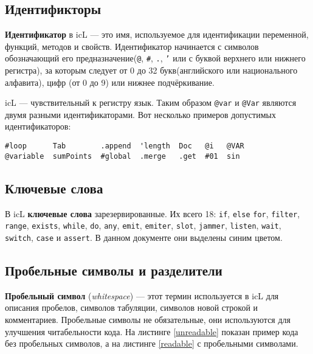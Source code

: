\subsection{Идентификторы}

\textbf{Идентификатор} в icL — это имя, используемое для идентификации переменной, функций, методов и свойств. Идентификатор начинается с символов обозначающий его предназначение(\texttt{@}, \texttt{#}, \texttt{.}, \texttt{'} или с буквой верхнего или нижнего регистра), за которым следует от 0 до 32 букв(английского или национального алфавита), цифр (от 0 до 9) или нижнее подчёркивание.

icL — чувствительный к регистру язык. Таким образом \texttt{@var} и \texttt{@Var} являются двумя разными идентификаторами. Вот несколько примеров допустимых идентификаторов:

\begin{verbatim}
#loop      Tab        .append  'length  Doc   @i   @VAR
@variable  sumPoints  #global  .merge   .get  #01  sin
\end{verbatim}

\subsection{Ключевые слова}

В icL \textbf{ключевые слова} зарезервированные. Их всего 18: \texttt{if}, \texttt{else} \texttt{for}, \texttt{filter}, \texttt{range}, \texttt{exists}, \texttt{while}, \texttt{do}, \texttt{any}, \texttt{emit}, \texttt{emiter}, \texttt{slot}, \texttt{jammer}, \texttt{listen}, \texttt{wait}, \texttt{switch}, \texttt{case} и \texttt{assert}. В данном документе они выделены синим цветом.

\subsection{Пробельные символы и разделители}

\textbf{Пробельный символ} (\textit{whitespace}) — этот термин используется в icL для описания пробелов, символов табуляции, символов новой строкой и комментариев. Пробельные символы не обязательные, они используются для улучшения читабельности кода. На листинге \ref{unreadable} показан пример кода без пробельных символов, а на листинге \ref{readable} с пробельными символами.

